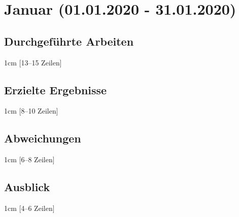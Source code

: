 \section*{Januar (01.01.2020 - 31.01.2020)}
\subsection*{Durchgeführte Arbeiten}
\begin{addmargin}{1cm}
	[13--15 Zeilen]
\end{addmargin}


\subsection*{Erzielte Ergebnisse}
\begin{addmargin}{1cm}
	[8--10 Zeilen]
\end{addmargin}


\subsection*{Abweichungen}
\begin{addmargin}{1cm}
	[6--8 Zeilen]
\end{addmargin}

\subsection*{Ausblick}
\begin{addmargin}{1cm}
	[4--6 Zeilen]
\end{addmargin}
\clearpage
